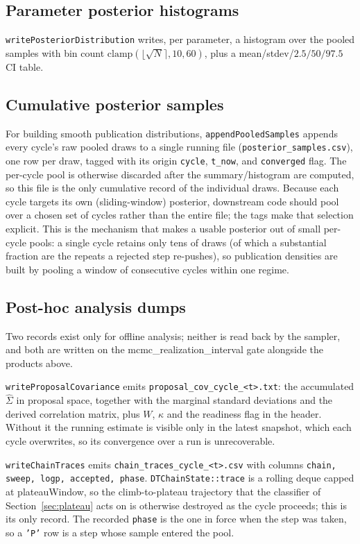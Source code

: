 \documentclass[11pt]{article}
\newcommand{\code}[1]{\texttt{\small #1}}
\newcommand{\param}[1]{\textsf{#1}}
\begin{document}
\subsection{Parameter posterior histograms}
\code{writePosteriorDistribution} writes, per parameter, a histogram over
the pooled samples with bin count $\mathrm{clamp}(\lfloor\sqrt N\rceil,
10, 60)$, plus a mean/stdev/$2.5/50/97.5$ CI table.

\subsection{Cumulative posterior samples}
For building smooth publication distributions, \code{appendPooledSamples}
appends every cycle's raw pooled draws to a single running file
(\code{posterior\_samples.csv}), one row per draw, tagged with its origin
\code{cycle}, \code{t\_now}, and \code{converged} flag. The per-cycle pool
is otherwise discarded after the summary/histogram are computed, so this
file is the only cumulative record of the individual draws. Because each
cycle targets its own (sliding-window) posterior, downstream code should
pool over a chosen set of cycles rather than the entire file; the tags
make that selection explicit. This is the mechanism that makes a usable
posterior out of small per-cycle pools: a single cycle retains only tens of
draws (of which a substantial fraction are the repeats a rejected step
re-pushes), so publication densities are built by pooling a window of
consecutive cycles within one regime.

\subsection{Post-hoc analysis dumps}
Two records exist only for offline analysis; neither is read back by the
sampler, and both are written on the \param{mcmc\_realization\_interval}
gate alongside the products above.

\code{writeProposalCovariance} emits
\code{proposal\_cov\_cycle\_<t>.txt}: the accumulated $\hat\Sigma$ in
proposal space, together with the marginal standard deviations and the
derived correlation matrix, plus $W$, $\kappa$ and the readiness flag in
the header. Without it the running estimate is visible only in the latest
snapshot, which each cycle overwrites, so its convergence over a run is
unrecoverable.

\code{writeChainTraces} emits \code{chain\_traces\_cycle\_<t>.csv} with
columns \code{chain, sweep, logp, accepted, phase}. \code{DTChainState::trace}
is a rolling deque capped at \param{plateauWindow}, so the climb-to-plateau
trajectory that the classifier of Section~\ref{sec:plateau} acts on is
otherwise destroyed as the cycle proceeds; this is its only record. The
recorded \code{phase} is the one in force when the step was taken, so a
\code{'P'} row is a step whose sample entered the pool.
\end{document}
